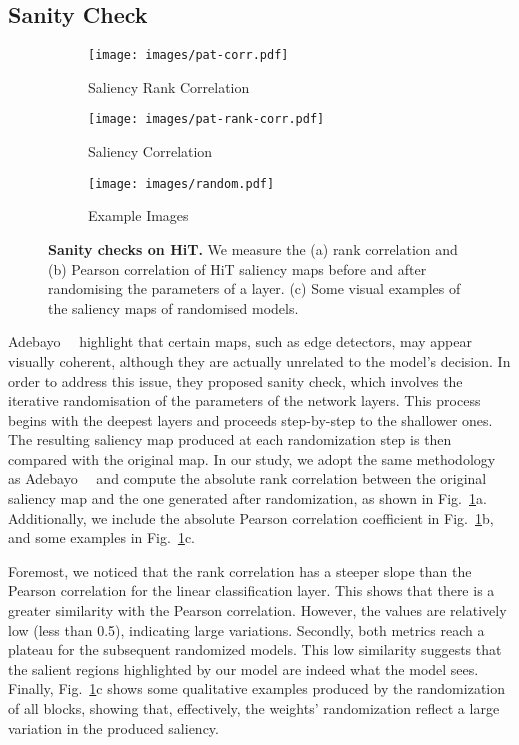 \subsection{Sanity Check}

\begin{figure}[t]
\centering
\begin{subfigure}{0.95\linewidth}
    \centering
    \texttt{[image: images/pat-corr.pdf]}
    \caption{Saliency Rank Correlation}
\end{subfigure}
\hfill
\begin{subfigure}{0.95\linewidth}
    \centering
    \texttt{[image: images/pat-rank-corr.pdf]}
    \caption{Saliency Correlation}
\end{subfigure}
\begin{subfigure}{0.95\linewidth}
    \centering
    \texttt{[image: images/random.pdf]}
    \caption{Example Images}
\end{subfigure}
\caption{\textbf{Sanity checks on HiT.} We measure the (a) rank correlation and (b) Pearson correlation of HiT saliency maps before and after randomising the parameters of a layer.   (c) Some visual examples of the saliency maps of randomised models.}
\label{fig:sanity}
\vspace{-3mm}
\end{figure}

Adebayo~\etal~\cite{NEURIPS2018_294a8ed2} highlight that certain maps, such as edge detectors, may appear visually coherent, although they are actually unrelated to the model's decision. 
In order to address this issue, they proposed sanity check, which involves the iterative randomisation of the parameters of the network layers. This process begins with the deepest layers and proceeds step-by-step to the shallower ones. The resulting saliency map produced at each randomization step is then compared with the original map.
In our study, we adopt the same methodology as Adebayo~\etal~\cite{NEURIPS2018_294a8ed2} and compute the absolute rank correlation between the original saliency map and the one generated after randomization, as shown in Fig.~\ref{fig:sanity}a. Additionally, we include the absolute Pearson correlation coefficient in Fig.~\ref{fig:sanity}b, and some examples in Fig.~\ref{fig:sanity}c.

Foremost, we noticed that the rank correlation has a steeper slope than the Pearson correlation for the linear classification layer. 
This shows that there is a greater similarity with the Pearson correlation. 
However, the values are relatively low (less than 0.5), indicating large variations.
Secondly, both metrics reach a plateau for the subsequent randomized models. 
This low similarity suggests that the salient regions highlighted by our model are indeed what the model sees.
Finally, Fig.~\ref{fig:sanity}c shows some qualitative examples produced by the randomization of all blocks, showing that, effectively, the weights' randomization reflect a large variation in the produced saliency.




